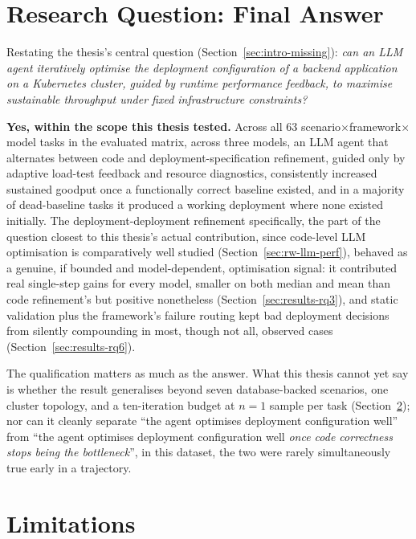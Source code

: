 \section{Research Question: Final Answer}
\label{sec:conclusion-rq}

Restating the thesis's central question (Section~\ref{sec:intro-missing}):
\emph{can an LLM agent iteratively optimise the deployment configuration
of a backend application on a Kubernetes cluster, guided by runtime
performance feedback, to maximise sustainable throughput under fixed
infrastructure constraints?}

\textbf{Yes, within the scope this thesis tested.} Across all 63
scenario$\times$framework$\times$model tasks in the evaluated matrix,
across three models, an LLM agent that alternates between code and
deployment-specification
refinement, guided only by adaptive load-test feedback and resource
diagnostics, consistently increased sustained goodput once a functionally
correct baseline existed, and in a majority of dead-baseline tasks it
produced a working deployment where none existed initially. The
deployment-deployment refinement specifically, the part of the question
closest to this thesis's actual contribution, since code-level LLM
optimisation is comparatively well studied
(Section~\ref{sec:rw-llm-perf}), behaved as a genuine, if bounded and
model-dependent, optimisation signal: it contributed real single-step
gains for every model, smaller on both median and mean than code
refinement's but positive nonetheless (Section~\ref{sec:results-rq3}), and
static validation plus the framework's failure routing kept bad
deployment decisions from silently compounding in most, though not all,
observed cases (Section~\ref{sec:results-rq6}).

The qualification matters as much as the answer. What this thesis cannot
yet say is whether the result generalises beyond seven database-backed
scenarios, one cluster topology, and a ten-iteration budget at $n=1$
sample per task
(Section~\ref{sec:conclusion-limitations}); nor can it cleanly separate
``the agent optimises deployment configuration well'' from ``the agent
optimises deployment configuration well \emph{once code correctness stops
being the bottleneck}'', in this dataset, the two were rarely
simultaneously true early in a trajectory.


\section{Limitations}
\label{sec:conclusion-limitations}

